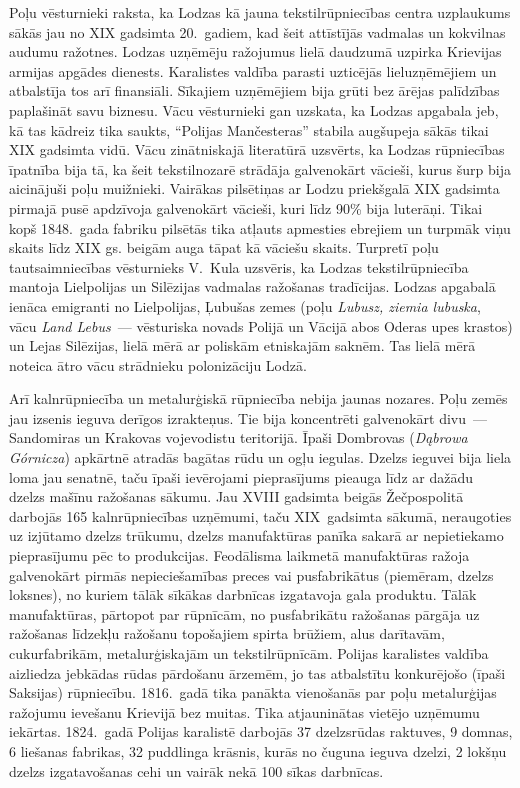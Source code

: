 \documentclass[twoside,a5paper,12pt,fleqn,openany]{extbook}
\newcommand{\pltxti}[1]{\textit{\textpolish{#1}}}
\newcommand{\detxti}[1]{\textit{\textgerman{#1}}}
\begin{document}
Poļu vēsturnieki raksta, ka Lodzas kā jauna tekstilrūpniecības centra uzplaukums sākās jau no XIX gadsimta 20.~gadiem, kad šeit attīstījās vadmalas un kokvilnas audumu ražotnes. Lodzas uzņēmēju ražojumus lielā daudzumā uzpirka Krievijas armijas apgādes dienests. Karalistes valdība parasti uzticējās lieluzņēmējiem un atbalstīja tos arī finansiāli. Sīkajiem uzņēmējiem bija grūti bez ārējas palīdzības paplašināt savu biznesu. Vācu vēsturnieki gan uzskata, ka Lodzas apgabala jeb, kā tas kādreiz tika saukts, ``Polijas Mančesteras'' stabila augšupeja sākās tikai XIX gadsimta vidū. Vācu zinātniskajā literatūrā uzsvērts, ka Lodzas rūpniecības īpatnība bija tā, ka šeit tekstilnozarē strādāja galvenokārt vācieši, kurus šurp bija aicinājuši poļu muižnieki. Vairākas pilsētiņas ar Lodzu priekšgalā XIX gadsimta pirmajā pusē apdzīvoja galvenokārt vācieši, kuri līdz 90\% bija luterāņi. Tikai kopš 1848.~gada fabriku pilsētās tika atļauts apmesties ebrejiem un turpmāk viņu skaits līdz XIX gs. beigām auga tāpat kā vāciešu skaits. Turpretī poļu tautsaimniecības vēsturnieks V.~Kula uzsvēris, ka Lodzas tekstilrūpniecība mantoja Lielpolijas un Silēzijas vadmalas ražošanas tradīcijas. Lodzas apgabalā ienāca emigranti no Lielpolijas, Ļubušas zemes (poļu \pltxti{Lubusz, ziemia lubuska}, vācu \detxti{Land Lebus}~--- vēsturiska novads Polijā un Vācijā abos Oderas upes krastos) un Lejas Silēzijas, lielā mērā ar poliskām etniskajām saknēm. Tas lielā mērā noteica ātro vācu strādnieku polonizāciju Lodzā.

Arī kalnrūpniecība un metalurģiskā rūpniecība nebija jaunas nozares. Poļu zemēs jau izsenis ieguva derīgos izrakteņus. Tie bija koncentrēti galvenokārt divu~--- Sandomiras un Krakovas vojevodistu teritorijā. Īpaši Dombrovas (\pltxti{Dąbrowa Górnicza}) apkārtnē atradās bagātas rūdu un ogļu iegulas. Dzelzs ieguvei bija liela loma jau senatnē, taču īpaši ievērojami pieprasījums pieauga līdz ar dažādu dzelzs mašīnu ražošanas sākumu. Jau XVIII gadsimta beigās Žečpospolitā darbojās 165 kalnrūpniecības uzņēmumi, taču XIX~gadsimta sākumā, neraugoties uz izjūtamo dzelzs trūkumu, dzelzs manufaktūras panīka sakarā ar nepietiekamo pieprasījumu pēc to produkcijas. Feodālisma laikmetā manufaktūras ražoja galvenokārt pirmās nepieciešamības preces vai pusfabrikātus (piemēram, dzelzs loksnes), no kuriem tālāk sīkākas darbnīcas izgatavoja gala produktu. Tālāk manufaktūras, pārtopot par rūpnīcām, no pusfabrikātu ražošanas pārgāja uz ražošanas līdzekļu ražošanu topošajiem spirta brūžiem, alus darītavām, cukurfabrikām, metalurģiskajām un tekstilrūpnīcām. Polijas karalistes valdība aizliedza jebkādas rūdas pārdošanu ārzemēm, jo tas atbalstītu konkurējošo (īpaši Saksijas) rūpniecību. 1816.~gadā tika panākta vienošanās par poļu metalurģijas ražojumu ievešanu Krievijā bez muitas. Tika atjauninātas vietējo uzņēmumu iekārtas. 1824.~gadā Polijas karalistē darbojās 37 dzelzsrūdas raktuves, 9 domnas, 6 liešanas fabrikas, 32 puddlinga krāsnis, kurās no čuguna ieguva dzelzi, 2 lokšņu dzelzs izgatavošanas cehi un vairāk nekā 100 sīkas darbnīcas.
\end{document}
